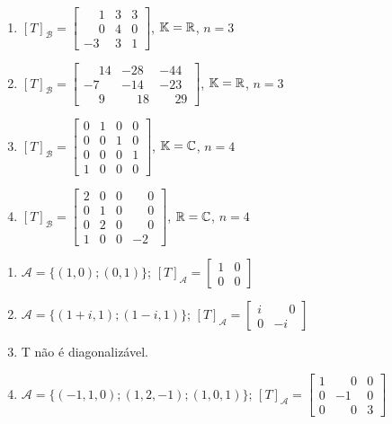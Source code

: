 \documentclass[12pt]{exam}
\begin{document}
\begin{exercicio}
\begin{enumerate}[label=({\alph*})]
    \item $[T]_\mathcal{B} = \begin{bmatrix} \phantom{-} 1 & 3 & 3\\ \phantom{-} 0 & 4 & 0\\ -3 & 3 & 1\end{bmatrix}$, $\mathbb{K} = \mathbb{R}$, $n = 3$
    \item $[T]_\mathcal{B} = \begin{bmatrix} \phantom{-} 14 & -28 & -44\\ -7 & -14 & -23\\ \phantom{-} 9 & \phantom{-} 18 & \phantom{-} 29\end{bmatrix}$, $\mathbb{K} = \mathbb{R}$, $n = 3$
    \item $[T]_\mathcal{B} = \begin{bmatrix} 0 & 1 & 0 & 0\\ 0 & 0 & 1 & 0\\ 0 & 0 & 0 & 1 \\ 1 & 0 & 0 & 0\end{bmatrix}$, $\mathbb{K} = \mathbb{C}$, $n = 4$
    \item $[T]_\mathcal{B} = \begin{bmatrix} 2 & 0 & 0 & \phantom{-}0\\ 0 & 1 & 0 & \phantom{-}0\\ 0 & 2 & 0 & \phantom{-}0 \\ 1 & 0 & 0 & -2\end{bmatrix}$, $\mathbb{R} = \mathbb{C}$, $n = 4$
  \end{enumerate}
  \begin{solucao}
      \begin{enumerate}[label=({\alph*})]
          \item $\mathcal{A} = \{(1,0);(0,1)\}$; $[T]_\mathcal{A} = \begin{bmatrix} 1 & 0\\ 0 & 0\end{bmatrix}$
          \item $\mathcal{A} = \{(1 + i,1);(1 - i,1)\}$; $[T]_\mathcal{A} = \begin{bmatrix} i & \phantom{-} 0\\ 0 & -i\end{bmatrix}$
          \item T n\~ao \'e diagonaliz\'avel.
          \item $\mathcal{A} = \{(-1,1,0);(1,2,-1);(1,0,1)\}$; $[T]_\mathcal{A} = \begin{bmatrix} 1 & \phantom{-} 0 & 0\\ 0 & -1 & 0\\0 & \phantom{-} 0 & 3\end{bmatrix}$

\end{enumerate}
\end{solucao}
\end{exercicio}
\end{document}

